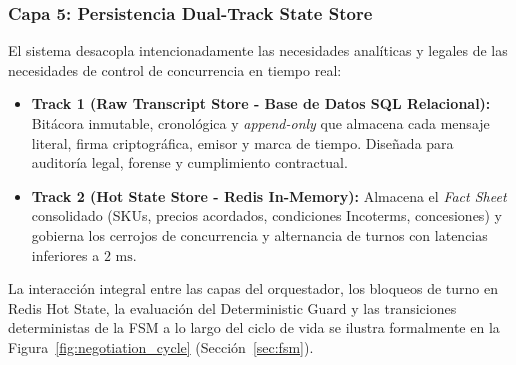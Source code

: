 \subsubsection{Capa 5: Persistencia Dual-Track State Store}
El sistema desacopla intencionadamente las necesidades analíticas y legales de las necesidades de control de concurrencia en tiempo real:
\begin{itemize}
    \item \textbf{Track 1 (Raw Transcript Store - Base de Datos SQL Relacional):} Bitácora inmutable, cronológica y \textit{append-only} que almacena cada mensaje literal, firma criptográfica, emisor y marca de tiempo. Diseñada para auditoría legal, forense y cumplimiento contractual.
    \item \textbf{Track 2 (Hot State Store - Redis In-Memory):} Almacena el \textit{Fact Sheet} consolidado (SKUs, precios acordados, condiciones Incoterms, concesiones) y gobierna los cerrojos de concurrencia y alternancia de turnos con latencias inferiores a $2\text{ ms}$.
\end{itemize}

La interacción integral entre las capas del orquestador, los bloqueos de turno en Redis Hot State, la evaluación del Deterministic Guard y las transiciones deterministas de la FSM a lo largo del ciclo de vida se ilustra formalmente en la Figura~\ref{fig:negotiation_cycle} (Sección~\ref{sec:fsm}).

